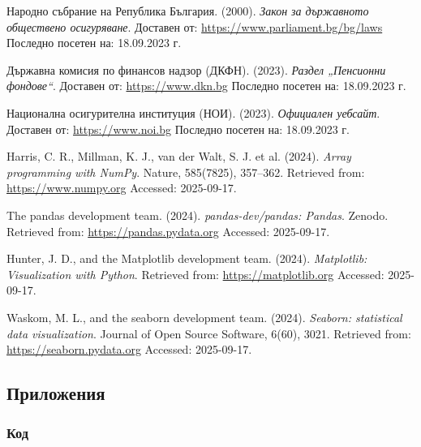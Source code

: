 \documentclass[a4paper,12pt]{article}
\begin{document}
\begin{thebibliography}{99}
        Народно събрание на Република България. (2000).
        \newblock \emph{Закон за държавното обществено осигуряване}.
        \newblock Доставен от: \url{https://www.parliament.bg/bg/laws}
        \newblock Последно посетен на: 18.09.2023 г.

        Държавна комисия по финансов надзор (ДКФН). (2023).
        \newblock \emph{Раздел „Пенсионни фондове“}.
        \newblock Доставен от: \url{https://www.dkn.bg}
        \newblock Последно посетен на: 18.09.2023 г.

        Национална осигурителна институция (НОИ). (2023).
        \newblock \emph{Официален уебсайт}.
        \newblock Доставен от: \url{https://www.noi.bg}
        \newblock Последно посетен на: 18.09.2023 г.

        Harris, C. R., Millman, K. J., van der Walt, S. J. et al. (2024).
        \newblock \emph{Array programming with NumPy}.
        \newblock Nature, 585(7825), 357–362.
        \newblock Retrieved from: \url{https://www.numpy.org}
        \newblock Accessed: 2025-09-17.

        The pandas development team. (2024).
        \newblock \emph{pandas-dev/pandas: Pandas}.
        \newblock Zenodo.
        \newblock Retrieved from: \url{https://pandas.pydata.org}
        \newblock Accessed: 2025-09-17.

        Hunter, J. D., and the Matplotlib development team. (2024).
        \newblock \emph{Matplotlib: Visualization with Python}.
        \newblock Retrieved from: \url{https://matplotlib.org}
        \newblock Accessed: 2025-09-17.

        Waskom, M. L., and the seaborn development team. (2024).
        \newblock \emph{Seaborn: statistical data visualization}.
        \newblock Journal of Open Source Software, 6(60), 3021.
        \newblock Retrieved from: \url{https://seaborn.pydata.org}
        \newblock Accessed: 2025-09-17.
\end{thebibliography}
\newpage
\subsection{Приложения}
\subsubsection{Код}





\end{document}
